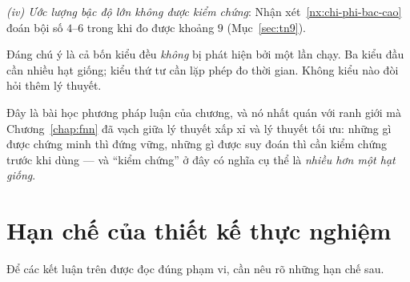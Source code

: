 \emph{(iv) Ước lượng bậc độ lớn không được kiểm chứng}: Nhận xét~\ref{nx:chi-phi-bac-cao}
đoán bội số $4$--$6$ trong khi đo được khoảng $9$ (Mục~\ref{sec:tn9}).

Đáng chú ý là cả bốn kiểu đều \emph{không} bị phát hiện bởi một lần chạy. Ba
kiểu đầu cần nhiều hạt giống; kiểu thứ tư cần lặp phép đo thời gian. Không kiểu
nào đòi hỏi thêm lý thuyết.

Đây là bài học phương pháp luận của chương, và nó nhất quán với ranh giới mà
Chương~\ref{chap:fnn} đã vạch giữa lý thuyết xấp xỉ và lý thuyết tối ưu: những gì
được chứng minh thì đứng vững, những gì được suy đoán thì cần kiểm chứng trước khi
dùng --- và ``kiểm chứng'' ở đây có nghĩa cụ thể là \emph{nhiều hơn một hạt
giống}.
 
\section{Hạn chế của thiết kế thực nghiệm}
\label{sec:hanche}
 
Để các kết luận trên được đọc đúng phạm vi, cần nêu rõ những hạn chế sau.
 
